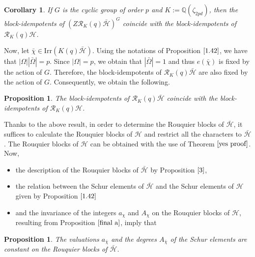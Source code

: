 \documentclass[10pt,a4paper,titlepage]{article}
\newtheorem{corollary}[theorem]{Corollary}
\newtheorem{proposition}[theorem]{Proposition}
\begin{document}
\begin{corollary}\label{3}
If $G$ is the cyclic group of order $p$ and $K:=\mathbb{Q}(\zeta_{2pd})$, then the block-idempotents of $(Z\mathcal{R}_K(q)\bar{\mathcal{H}})^G$ coincide with the block-idempotents of $\mathcal{R}_K(q)\mathcal{H}$.
\end{corollary}


Now, let $\bar{\chi} \in \mathrm{Irr}(K(q)\bar{\mathcal{H}})$. Using the notations of Proposition $\ref{1.42}$, we have that
$|\Omega||\bar{\Omega}|=p.$
Since $|\Omega|=p$, we obtain that $|\bar{\Omega}|=1$
and thus $e(\bar{\chi})$ is fixed by the action of $G$. Therefore,
the block-idempotents of $\mathcal{R}_K(q)\bar{\mathcal{H}}$ are also fixed by the action of $G$. Consequently, we obtain the following.


\begin{proposition}\label{4}
The block-idempotents of $\mathcal{R}_K(q)\bar{\mathcal{H}}$ coincide with the block-idempotents of $\mathcal{R}_K(q)\mathcal{H}$.
\end{proposition}

 Thanks to the above result, in order to determine the Rouquier blocks of $\bar{\mathcal{H}}$, it suffices to calculate the Rouquier blocks of $\mathcal{H}$ and restrict all the characters to $\bar{\mathcal{H}}$. The Rouquier blocks of $\mathcal{H}$ can be obtained with the use of Theorem $\ref{yes proof}$.\\

Now,
\begin{itemize}
\item the description of the Rouquier blocks of $\bar{\mathcal{H}}$ by Proposition $\ref{3}$,
\item the relation between the Schur elements of $\bar{\mathcal{H}}$
and the Schur elements of $\mathcal{H}$ given by Proposition $\ref{1.42}$
\item and the invariance of the integers $a_\chi$ and $A_\chi$ on the Rouquier blocks of $\mathcal{H}$, resulting from Proposition $\ref{final a}$, imply that
\end{itemize}

\begin{proposition}\label{fin}
The valuations $a_{\bar{\chi}}$ and the degrees $A_{\bar{\chi}}$ of the Schur elements are constant on the Rouquier blocks of $\bar{\mathcal{H}}$.
\end{proposition}
\end{document}
